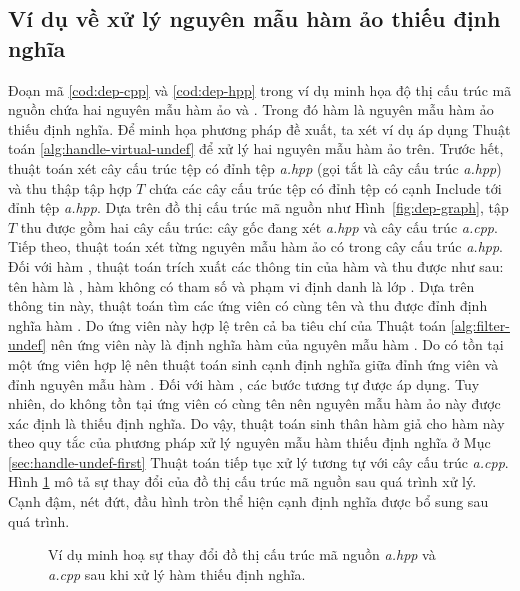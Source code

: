 \subsection*{Ví dụ về xử lý nguyên mẫu hàm ảo thiếu định nghĩa}
Đoạn mã \ref{cod:dep-cpp} và \ref{cod:dep-hpp} trong ví dụ minh họa độ thị cấu trúc mã nguồn chứa hai nguyên mẫu hàm ảo  và . Trong đó hàm  là nguyên mẫu hàm ảo thiếu định nghĩa. Để minh họa phương pháp đề xuất, ta xét ví dụ áp dụng Thuật toán \ref{alg:handle-virtual-undef} để xử lý hai nguyên mẫu hàm ảo trên. Trước hết, thuật toán xét cây cấu trúc tệp có đỉnh tệp \textit{a.hpp} (gọi tắt là cây cấu trúc \textit{a.hpp}) và thu thập tập hợp $T$ chứa các cây cấu trúc tệp có đỉnh tệp có cạnh Include tới đỉnh tệp \textit{a.hpp}. Dựa trên đồ thị cấu trúc mã nguồn như Hình~\ref{fig:dep-graph}, tập $T$ thu được gồm hai cây cấu trúc: cây gốc đang xét \textit{a.hpp} và cây cấu trúc \textit{a.cpp}. Tiếp theo, thuật toán xét từng nguyên mẫu hàm ảo có trong cây cấu trúc \textit{a.hpp}. Đối với hàm , thuật toán trích xuất các thông tin của hàm và thu được như sau: tên hàm là , hàm không có tham số và phạm vi định danh là lớp . Dựa trên thông tin này, thuật toán tìm các ứng viên có cùng tên  và thu được đỉnh định nghĩa hàm . Do ứng viên này hợp lệ trên cả ba tiêu chí của Thuật toán \ref{alg:filter-undef} nên ứng viên này là định nghĩa hàm của nguyên mẫu hàm . Do có tồn tại một ứng viên hợp lệ nên thuật toán sinh cạnh định nghĩa giữa đỉnh ứng viên và đỉnh nguyên mẫu hàm . Đối với hàm , các bước tương tự được áp dụng. Tuy nhiên, do không tồn tại ứng viên có cùng tên  nên nguyên mẫu hàm ảo này được xác định là thiếu định nghĩa. Do vậy, thuật toán sinh thân hàm giả cho hàm này theo quy tắc của phương pháp xử lý nguyên mẫu hàm thiếu định nghĩa ở Mục \ref{sec:handle-undef-first} Thuật toán tiếp tục xử lý tương tự với cây cấu trúc \textit{a.cpp}. Hình \ref{fig:dep-graph-final} mô tả sự thay đổi của đồ thị cấu trúc mã nguồn sau quá trình xử lý. Cạnh đậm, nét đứt, đầu hình tròn thể hiện cạnh định nghĩa được bổ sung sau quá trình.

\begin{figure}[!h]
    \centering
    
    \caption{Ví dụ minh hoạ sự thay đổi đồ thị cấu trúc mã nguồn \textit{a.hpp} và \textit{a.cpp} sau khi xử lý hàm thiếu định nghĩa.}
    \label{fig:dep-graph-final}
\end{figure}

